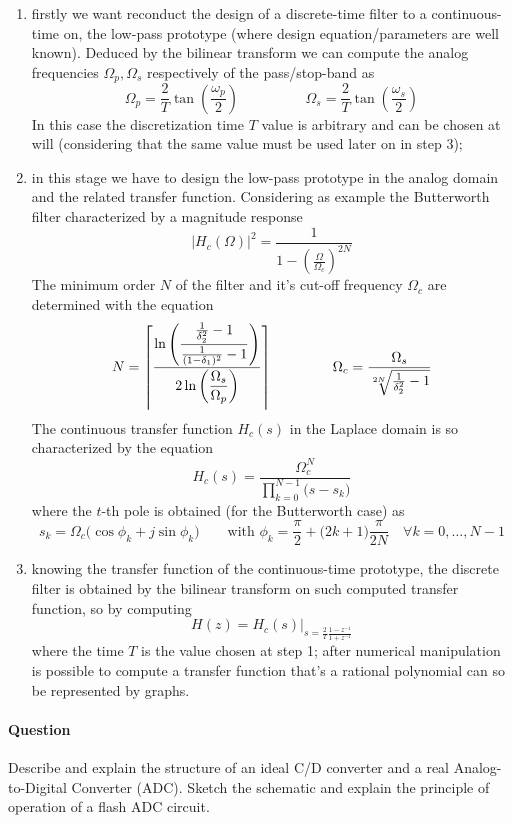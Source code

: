 	\begin{enumerate}
		\item firstly we want reconduct the design of a discrete-time filter to a continuous-time on, the low-pass prototype (where design equation/parameters are well known). Deduced by the bilinear transform we can compute the analog frequencies $\Omega_p,\Omega_s$ respectively of the pass/stop-band as
		\[ \Omega_p = \frac 2 T \tan\left( \frac{\omega_p}2 \right) \hspace{2cm} \Omega_s = \frac 2 T \tan\left( \frac{\omega_s}2 \right) \]
		In this case the discretization time $T$ value is arbitrary and can be chosen at will (considering that the same value must be used later on in step 3);
		
		\item in this stage we have to design the low-pass prototype in the analog domain and the related transfer function. Considering as example the Butterworth filter characterized by a magnitude response
		\[ |H_c(\Omega)|^2 = \frac{1}{1-\left(\frac{\Omega}{\Omega_c}\right)^{2N}} \]
		The minimum order $N$ of the filter and it's cut-off frequency $\Omega_c$ are determined with the equation
		\[ N = \left\lceil  \frac{ \ln \left( \dfrac{ \frac{1}{\delta_2^2} -1 }{\frac 1{(1-\delta_1)^2} - 1} \right)  }{ 2\ln \left(\dfrac{\Omega_s}{\Omega_p}\right)}  \right\rceil \hspace{1.5cm} \Omega_c = \frac{\Omega_s}{\sqrt[2N]{ \frac{1} {\delta_2^2}-1}}   \]
		The continuous transfer function $H_c(s)$ in the Laplace domain is so characterized by the equation
		\[ H_c(s) = \frac{ \Omega_c^N }{\prod_{k=0}^{N-1} \big(s-s_k\big)} \]
		where the $t$-th pole is obtained (for the Butterworth case) as
		\[ s_k = \Omega_c\Big( \cos\phi_k + j \sin\phi_k \Big)  \qquad \textrm{with } \phi_k = \frac \pi 2 + \big(2k+1\big) \frac{\pi}{2N} \quad \forall k=0,\dots, N-1 \]
		
		\item knowing the transfer function of the continuous-time prototype, the discrete filter is obtained by the bilinear transform on such computed transfer function, so by computing
		\[ H(z) = H_c(s) \Big|_{ s= \frac 2 T \frac{1-z^{-1}}{1+z^{-1}} } \]
		where the time $T$ is the value chosen at step 1; after numerical manipulation is possible to compute a transfer function that's a rational polynomial can so be represented by graphs.
	\end{enumerate}

\newquestion
	\paragraph{Question} Describe and explain the structure of an ideal C/D converter and a real Analog-to-Digital Converter (ADC). Sketch the schematic and explain the principle of operation of a flash ADC circuit.


